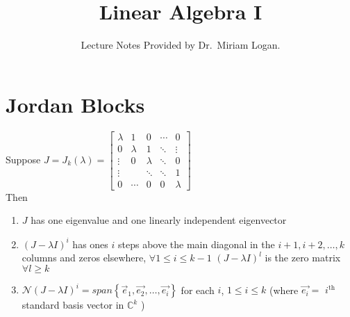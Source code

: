 \documentclass{report}
\begin{document}
\title{Linear Algebra I}
\author{Lecture Notes Provided by Dr.~Miriam Logan.}
\date{}
\maketitle
\tableofcontents
\newpage  
\section{Jordan Blocks}
\thm{}
{
Suppose $ J = J _k \left( \lambda \right) = \begin{bmatrix}
  \lambda & 1       & 0       & \cdots & 0 \\[2pt]
  0       & \lambda & 1       & \ddots & \vdots \\[2pt]
  \vdots  & 0       & \lambda & \ddots & 0 \\[2pt]
  \vdots  &         & \ddots  & \ddots & 1 \\[2pt]
  0       & \cdots  & 0       & 0      & \lambda
\end{bmatrix}$ \\
Then 
\begin{enumerate}[label=(\arabic*).]  
\item $ J$ has one eigenvalue and one linearly independent eigenvector
\item  $ \left( J - \lambda I \right) ^{ i}$ has ones $ i$ steps above the main diagonal in the $ i+1 ,i+2,\ldots, k$  columns and zeros elsewhere, $ \forall 1 \leq i \leq k-1$ $ \left( J - \lambda I \right) ^{l} $ is the zero matrix $ \forall  l \ge k$ 
\item $ \mathcal{N} \left( J - \lambda I \right) ^{i} = span \left\{ \vec{ e}_1, \vec{ e_2} , \ldots , \vec{ e_i}  \right\} $ 
	for each $ i $, $ 1 \leq i \leq k$ (where $ \vec{ e_i} =$ $i^{\text{th}}$ standard basis vector in $ \mathbb{C} ^{k}$ )
\end{enumerate}


}
\end{document}
